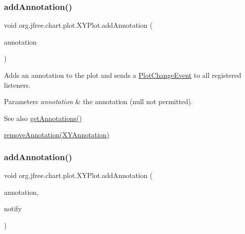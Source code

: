 \subsubsection{\texorpdfstring{add\+Annotation()}{addAnnotation()}\hspace{0.1cm}{\footnotesize\ttfamily [1/2]}}
{\footnotesize\ttfamily void org.\+jfree.\+chart.\+plot.\+X\+Y\+Plot.\+add\+Annotation (\begin{DoxyParamCaption}\item[{\mbox{\hyperlink{interfaceorg_1_1jfree_1_1chart_1_1annotations_1_1_x_y_annotation}{X\+Y\+Annotation}}}]{annotation }\end{DoxyParamCaption})}

Adds an annotation to the plot and sends a \mbox{\hyperlink{}{Plot\+Change\+Event}} to all registered listeners.


\begin{DoxyParams}{Parameters}
{\em annotation} & the annotation ({\ttfamily null} not permitted).\\
\hline
\end{DoxyParams}
\begin{DoxySeeAlso}{See also}
\mbox{\hyperlink{classorg_1_1jfree_1_1chart_1_1plot_1_1_x_y_plot_a65d05a1b516c28eed73f42fb7aa9f92f}{get\+Annotations()}} 

\mbox{\hyperlink{classorg_1_1jfree_1_1chart_1_1plot_1_1_x_y_plot_ac97759634d8b42964de98550f87afc3a}{remove\+Annotation(\+X\+Y\+Annotation)}} 
\end{DoxySeeAlso}
\mbox{\label{classorg_1_1jfree_1_1chart_1_1plot_1_1_x_y_plot_ae859fc691c35e78bb24086a01c2054e5}} 
\subsubsection{\texorpdfstring{add\+Annotation()}{addAnnotation()}\hspace{0.1cm}{\footnotesize\ttfamily [2/2]}}
{\footnotesize\ttfamily void org.\+jfree.\+chart.\+plot.\+X\+Y\+Plot.\+add\+Annotation (\begin{DoxyParamCaption}\item[{\mbox{\hyperlink{interfaceorg_1_1jfree_1_1chart_1_1annotations_1_1_x_y_annotation}{X\+Y\+Annotation}}}]{annotation,  }\item[{boolean}]{notify }\end{DoxyParamCaption})}

